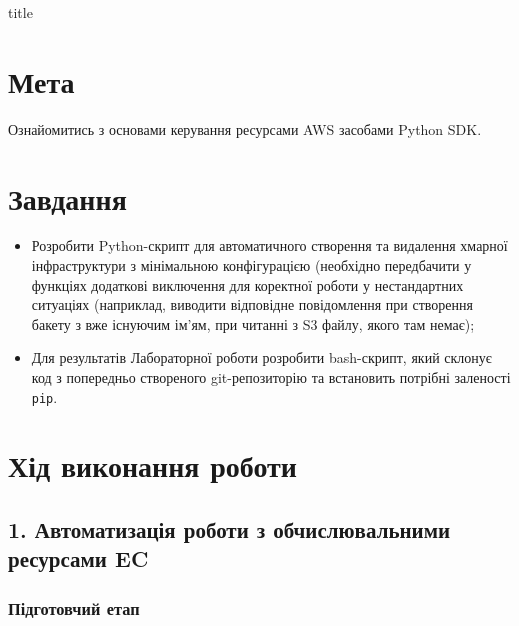 \documentclass[a4paper,14pt]{extarticle} %
\begin{document}
{title}

\newpage

\section*{Мета}

Ознайомитись з основами керування ресурсами AWS засобами Python SDK.

\section*{Завдання} 

\begin{itemize}
    \item Розробити Python-скрипт для автоматичного створення та видалення хмарної інфраструктури з 
    мінімальною конфігурацією (необхідно передбачити у функціях додаткові виключення для коректної роботи у 
    нестандартних ситуаціях (наприклад, виводити відповідне повідомлення при створення бакету з вже існуючим 
    ім’ям, при читанні з S3 файлу, якого там немає);
    \item Для результатів Лабораторної роботи  розробити bash-скрипт, який склонує код з 
    попередньо створеного git-репозиторію та встановить потрібні заленості \texttt{pip}.
\end{itemize}

\section*{Хід виконання роботи}

\subsection*{1. Автоматизація роботи з обчислювальними ресурсами EC}

\subsubsection*{Підготовчий етап}
\end{document}
